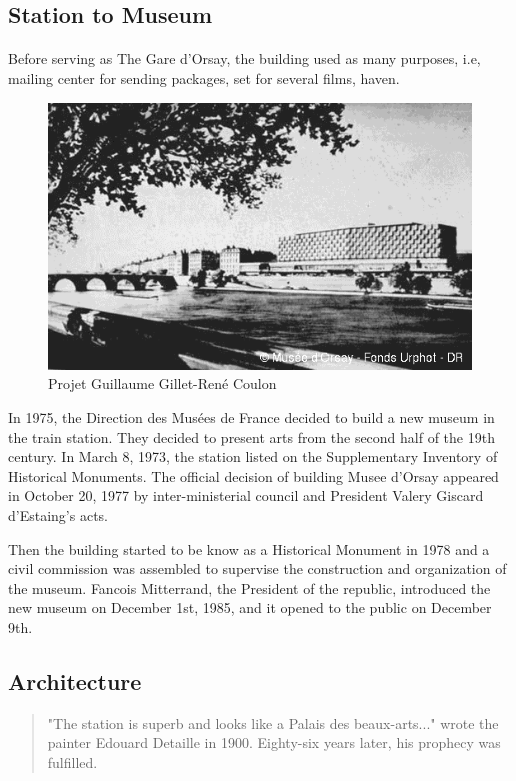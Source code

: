 \documentclass[
10pt, %
a4paper, %
oneside, %
headinclude,footinclude, %
BCOR5mm, %
]{scrartcl}
\theoremstyle{definition} %
\theoremstyle{plain} %
\theoremstyle{remark} %
\begin{document}
\subsection{Station to Museum}

\paragraph{}
Before serving as The Gare d'Orsay, the building used as many purposes, i.e, mailing center for sending packages, set for several films, haven. 

\begin{figure}[tbh]
\centering
\includegraphics[width=.60\columnwidth]{Images/6.png}
\caption[Projet Guillaume Gillet-René Coulon]{Projet Guillaume Gillet-René Coulon} %
\label{fig:station2museum}
\end{figure}

In 1975, the Direction des Musées de France decided to build a new museum in the train station. They decided to present arts from the second half of the 19th century. In March 8, 1973, the station listed on the Supplementary Inventory of Historical Monuments. The official decision of building Musee d'Orsay appeared in October 20, 1977 by inter-ministerial council and President Valery Giscard d'Estaing's acts.

Then the building started to be know as a Historical Monument in 1978 and a civil commission was assembled to supervise the construction and organization of the museum. Fancois Mitterrand, the President of the republic, introduced the new museum on December 1st, 1985, and it opened to the public on December 9th.


\subsection{Architecture}

\begin{quote}
"The station is superb and looks like a Palais des beaux-arts..." wrote the painter Edouard Detaille in 1900. Eighty-six years later, his prophecy was fulfilled.\cite{orsayMuseumHistory}
\end{quote}
\end{document}
